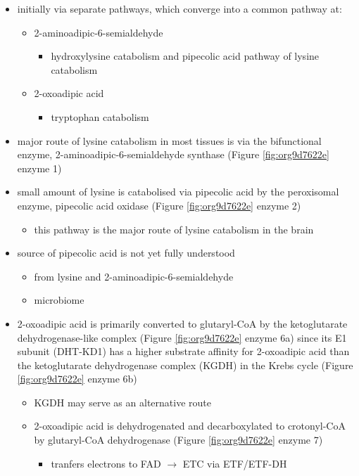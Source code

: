 \documentclass[12pt]{scrartcl}
\begin{document}
\begin{center}
\begin{center}
\begin{itemize}
\item initially via separate pathways, which converge into a common 
pathway at:
\begin{itemize}
\item 2-aminoadipic-6-semialdehyde
\begin{itemize}
\item hydroxylysine catabolism and pipecolic acid pathway of lysine
catabolism
\end{itemize}
\item 2-oxoadipic acid
\begin{itemize}
\item tryptophan catabolism
\end{itemize}
\end{itemize}
\item major route of lysine catabolism in most tissues is via the
bifunctional enzyme, 2-aminoadipic-6-semialdehyde synthase (Figure \ref{fig:org9d7622e} enzyme 1)
\item small amount of lysine is catabolised via pipecolic acid by the
peroxisomal enzyme, pipecolic acid oxidase (Figure \ref{fig:org9d7622e} enzyme 2)
\begin{itemize}
\item this pathway is the major route of lysine catabolism in the
brain
\end{itemize}
\item source of pipecolic acid is not yet fully understood
\begin{itemize}
\item from lysine and 2-aminoadipic-6-semialdehyde
\item microbiome
\end{itemize}
\item 2-oxoadipic acid is primarily converted to glutaryl-CoA by the
ketoglutarate dehydrogenase-like complex (Figure \ref{fig:org9d7622e} enzyme 6a)
since its E1 subunit (DHT-KD1) has a higher substrate affinity for
2-oxoadipic acid than the ketoglutarate dehydrogenase complex (KGDH) in
the Krebs cycle (Figure \ref{fig:org9d7622e} enzyme 6b)
\begin{itemize}
\item KGDH may serve as an alternative route
\item 2-oxoadipic acid is dehydrogenated and decarboxylated to
crotonyl-CoA by glutaryl-CoA dehydrogenase (Figure \ref{fig:org9d7622e} enzyme 7)
\begin{itemize}
\item tranfers electrons to FAD \(\to\) ETC via ETF/ETF-DH

\end{itemize}
\end{itemize}
\end{itemize}
\end{center}
\end{center}
\end{document}
